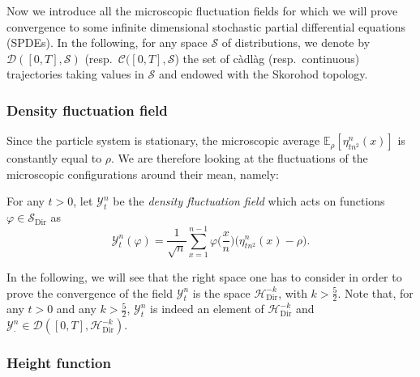 \documentclass[AHL,Unicode,longabstracts]{cedram}
\DeclareMathOperator{\Dir}{Dir}
\newcommand{\bb}[1]{{\mathbb #1}}
\newcommand{\mc}[1]{{\mathcal #1}}
\renewcommand{\mc}[1]{{\mathcal #1}}
\renewcommand{\tfrac}{\frac}
\begin{document}
Now we introduce all the microscopic fluctuation fields for which we will prove convergence to some infinite dimensional stochastic partial differential equations (SPDEs). In the following, for any space $\mc S$ of distributions, we denote by $\mathcal{D}([0,T], \mc S)$ (resp.~$\mathcal C([0,T], \mc S$) the set of c\`adl\`ag (resp.~continuous) trajectories taking values in $\mc S$ and endowed with the Skorohod topology.

\subsubsection{Density fluctuation field}\label{ssec:density}

Since the particle system is stationary, the microscopic average $\bb E_\rho[\eta^n_{tn^2}(x)]$ is constantly equal to $\rho$. We are therefore looking at the fluctuations of the microscopic configurations around their mean, namely:

\begin{defi}
For any $t>0$, let $\mathcal{Y}^n_t$ be the \emph{density fluctuation
field} which acts on functions $\varphi\in \mc S_{\Dir}$ as
\begin{equation*}
\mathcal Y^n_t (\varphi) = \frac 1{\sqrt n} \sum_{x=1}^{n-1} \varphi\bigg(\tfrac x n\bigg)
\big(\eta^n_{tn^2}(x) - \rho\big).
\end{equation*}
\end{defi}

In the following, we will see that the right space one has to consider in order to prove the convergence of the field $\mc Y_t^n$ is the space $\mc H_{\Dir}^{-k}$, with $k>\frac52$. Note that, for any $t>0$ and any $k > \frac{5}{2}$, $\mc Y_t^n$ is indeed an element of $\mathcal{H}_{\Dir}^{-k}$ and $\mc Y^n_\cdot \in \mathcal{D}([0,T], \mathcal{H}_{\Dir}^{-k})$.


\subsubsection{Height function} \label{ssec:height}
\end{document}
